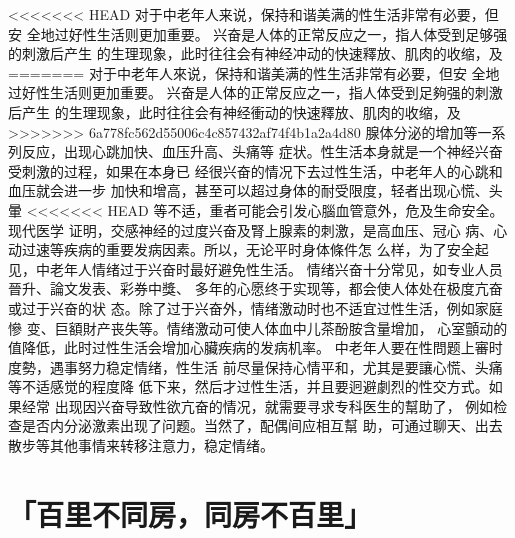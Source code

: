 \documentclass[12pt,UTF8]{ctexbook}
\begin{document}
<<<<<<< HEAD
对于中老年人来说，保持和谐美满的性生活非常有必要，但安
全地过好性生活则更加重要。
兴奋是人体的正常反应之一，指人体受到足够强的刺激后产生
的生理现象，此时往往会有神经冲动的快速釋放、肌肉的收缩，及
=======
对于中老年人來说，保持和谐美满的性生活非常有必要，但安
全地过好性生活则更加重要。
兴奋是人体的正常反应之一，指人体受到足夠强的刺激后产生
的生理现象，此时往往会有神经衝动的快速釋放、肌肉的收缩，及
>>>>>>> 6a778fc562d55006c4c857432af74f4b1a2a4d80
腺体分泌的增加等一系列反应，出现心跳加快、血压升高、头痛等
症状。性生活本身就是一个神经兴奋受刺激的过程，如果在本身已
经很兴奋的情况下去过性生活，中老年人的心跳和血压就会进一步
加快和增高，甚至可以超过身体的耐受限度，轻者出现心慌、头暈
<<<<<<< HEAD
等不适，重者可能会引发心腦血管意外，危及生命安全。现代医学
证明，交感神经的过度兴奋及腎上腺素的刺激，是高血压、冠心
病、心动过速等疾病的重要发病因素。所以，无论平时身体條件怎
么样，为了安全起见，中老年人情绪过于兴奋时最好避免性生活。
情绪兴奋十分常见，如专业人员晉升、論文发表、彩券中獎、
多年的心愿终于实现等，都会使人体处在极度亢奋或过于兴奋的状
态。除了过于兴奋外，情绪激动时也不适宜过性生活，例如家庭慘
变、巨額財产丧失等。情绪激动可使人体血中儿茶酚胺含量增加，
心室顫动的值降低，此时过性生活会增加心臟疾病的发病机率。
中老年人要在性問题上審时度勢，遇事努力稳定情绪，性生活
前尽量保持心情平和，尤其是要讓心慌、头痛等不适感觉的程度降
低下来，然后才过性生活，并且要迥避劇烈的性交方式。如果经常
出现因兴奋导致性欲亢奋的情况，就需要寻求专科医生的幫助了，
例如检查是否内分泌激素出现了问题。当然了，配偶间应相互幫
助，可通过聊天、出去散步等其他事情来转移注意力，稳定情绪。

\section{「百里不同房，同房不百里」}
\end{document}
